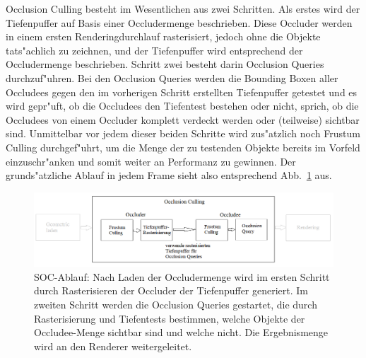 \documentclass[journal]{vgtc}
\begin{document}
Occlusion Culling besteht im Wesentlichen aus zwei Schritten. Als erstes wird der Tiefenpuffer auf Basis einer Occludermenge beschrieben.
Diese Occluder werden in einem ersten Renderingdurchlauf rasterisiert, jedoch ohne die Objekte tats"achlich zu zeichnen, und der Tiefenpuffer wird entsprechend der Occludermenge beschrieben.
Schritt zwei besteht darin Occlusion Queries durchzuf"uhren.
Bei den Occlusion Queries werden die Bounding Boxen aller Occludees gegen den im vorherigen Schritt erstellten Tiefenpuffer getestet und es wird gepr"uft, ob die Occludees den Tiefentest bestehen oder nicht, sprich, ob die Occludees von einem Occluder komplett verdeckt werden oder (teilweise) sichtbar sind.
Unmittelbar vor jedem dieser beiden Schritte wird zus"atzlich noch Frustum Culling durchgef"uhrt, um die Menge der zu testenden Objekte bereits im Vorfeld einzuschr"anken und somit weiter an Performanz zu gewinnen.
Der grunds"atzliche Ablauf in jedem Frame sieht also entsprechend Abb.\ \ref{fig:socablauf} aus.
\begin{figure}%
\includegraphics[width=\columnwidth]{images/SOCAblauf3.png}%
\caption{SOC-Ablauf: Nach Laden der Occludermenge wird im ersten Schritt durch Rasterisieren der Occluder der Tiefenpuffer generiert. Im zweiten Schritt werden die Occlusion Queries gestartet, die durch Rasterisierung und Tiefentests bestimmen, welche Objekte der Occludee-Menge sichtbar sind und welche nicht. Die Ergebnismenge wird an den Renderer weitergeleitet.}%
\label{fig:socablauf}%
\end{figure}
\end{document}
